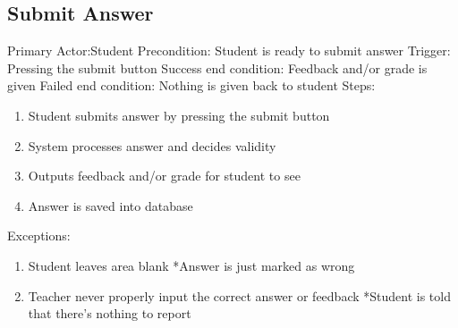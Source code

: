     \subsection{Submit Answer}
        Primary Actor:Student \newline
        Precondition: Student is ready to submit answer \newline
        Trigger: Pressing the submit button \newline
        Success end condition: Feedback and/or grade is given       \newline
        Failed end condition: Nothing is given back to student      \newline
        \newline
        Steps:
        \begin{enumerate}
            \item{Student submits answer by pressing the submit             button}
            \item{System processes answer and decides validity}
            \item{Outputs feedback and/or grade for student to see}
            \item{Answer is saved into database}
        \end{enumerate}
        Exceptions:
        \begin{enumerate}
            \item{Student leaves area blank \newline
        	*Answer is just marked as wrong}
        	\addtocounter{enumi}{1}
            \item{Teacher never properly input the correct answer or     feedback \newline
        	*Student is told that there's nothing to report}
        \end{enumerate}

    
